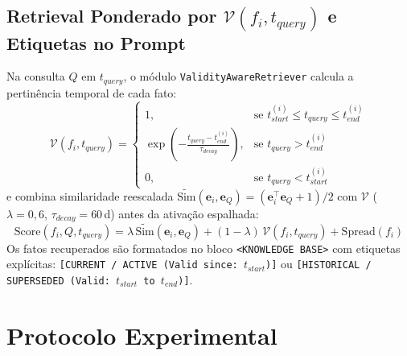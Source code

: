 \documentclass[10pt,conference,twocolumn]{IEEEtran}
\begin{document}
\subsection{Retrieval Ponderado por $\mathcal{V}(f_i, t_{query})$ e Etiquetas no Prompt}
Na consulta $Q$ em $t_{query}$, o módulo \texttt{ValidityAwareRetriever} calcula a pertinência temporal de cada fato:
\begin{equation}
\mathcal{V}(f_i, t_{query}) =
\begin{cases}
1, & \text{se } t_{start}^{(i)} \le t_{query} \le t_{end}^{(i)} \\
\exp\left(-\frac{t_{query} - t_{end}^{(i)}}{\tau_{decay}}\right), & \text{se } t_{query} > t_{end}^{(i)} \\
0, & \text{se } t_{query} < t_{start}^{(i)}
\end{cases}
\end{equation}
e combina similaridade reescalada $\widetilde{\text{Sim}}(\mathbf{e}_i, \mathbf{e}_Q) = (\mathbf{e}_i^\top \mathbf{e}_Q + 1)/2$ com $\mathcal{V}$ ($\lambda = 0{,}6$, $\tau_{decay} = 60$\,d) antes da ativação espalhada:
\begin{equation}
\text{Score}(f_i, Q, t_{query}) = \lambda \, \widetilde{\text{Sim}}(\mathbf{e}_i, \mathbf{e}_Q) + (1-\lambda) \, \mathcal{V}(f_i, t_{query}) + \text{Spread}(f_i)
\end{equation}
Os fatos recuperados são formatados no bloco \texttt{<KNOWLEDGE BASE>} com etiquetas explícitas: \texttt{[CURRENT / ACTIVE (Valid since: $t_{start}$)]} ou \texttt{[HISTORICAL / SUPERSEDED (Valid: $t_{start}$ to $t_{end}$)]}.

\section{Protocolo Experimental}
\end{document}
